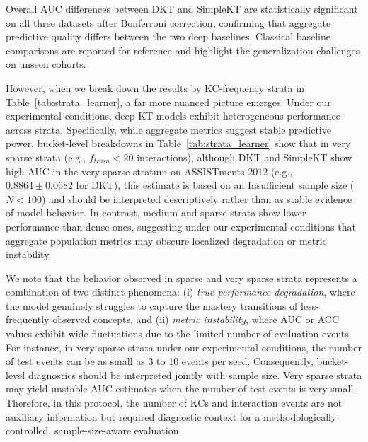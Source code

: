 



Overall AUC differences between DKT and SimpleKT are statistically significant on all three datasets after Bonferroni correction, confirming that aggregate predictive quality differs between the two deep baselines. Classical baseline comparisons are reported for reference and highlight the generalization challenges on unseen cohorts.

However, when we break down the results by KC-frequency strata in Table~\ref{tab:strata_learner}, a far more nuanced picture emerges. Under our experimental conditions, deep KT models exhibit heterogeneous performance across strata. Specifically, while aggregate metrics suggest stable predictive power, bucket-level breakdowns in Table~\ref{tab:strata_learner} show that in very sparse strata (e.g., $f_{train} < 20$ interactions), although DKT and SimpleKT show high AUC in the very sparse stratum on ASSISTments 2012 (e.g., $0.8864 \pm 0.0682$ for DKT), this estimate is based on an Insufficient sample size ($N < 100$) and should be interpreted descriptively rather than as stable evidence of model behavior. In contrast, medium and sparse strata show lower performance than dense ones, suggesting under our experimental conditions that aggregate population metrics may obscure localized degradation or metric instability.



We note that the behavior observed in sparse and very sparse strata represents a combination of two distinct phenomena: (i) \textit{true performance degradation}, where the model genuinely struggles to capture the mastery transitions of less-frequently observed concepts, and (ii) \textit{metric instability}, where AUC or ACC values exhibit wide fluctuations due to the limited number of evaluation events. For instance, in very sparse strata under our experimental conditions, the number of test events can be as small as 3 to 10 events per seed. Consequently, bucket-level diagnostics should be interpreted jointly with sample size. Very sparse strata may yield unstable AUC estimates when the number of test events is very small. Therefore, in this protocol, the number of KCs and interaction events are not auxiliary information but required diagnostic context for a methodologically controlled, sample-size-aware evaluation.

